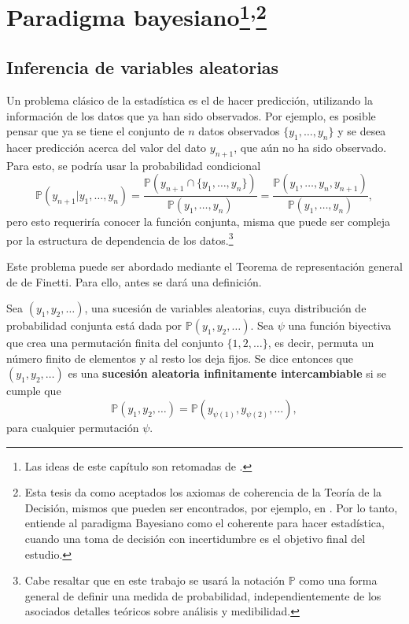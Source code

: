\chapter[Paradigma Bayesiano]{Paradigma bayesiano\footnote{Las ideas de este cap\'itulo son retomadas de \cite{Denison_BayesMethods}.}\textsuperscript{,}\footnote{Esta tesis da como aceptados los axiomas de coherencia de la Teoría de la Decisión, mismos que pueden ser encontrados, por ejemplo, en \cite{Fishburn_Axioms}. Por lo tanto, entiende al paradigma Bayesiano como el coherente para hacer estad\'istica, cuando una toma de decisi\'on con incertidumbre es el objetivo final del estudio. 
}}

\section{Inferencia de variables aleatorias}

Un problema clásico de la estad\'istica es el de hacer predicci\'on, utilizando la informaci\'on de los datos que ya han sido observados. Por ejemplo, es posible pensar que ya se tiene el conjunto de $n$ datos observados $\{y_1, \ldots, y_n\}$ y se desea hacer predicci\'on acerca del valor del dato $y_{n+1}$, que a\'un no ha sido observado. Para esto, se podr\'ia usar la probabilidad condicional
\begin{equation*}
    \mathbb{P}(y_{n+1}|y_1,\ldots,y_n) =
    \frac{\mathbb{P}(y_{n+1} \cap \{y_1, \ldots, y_n\})}{\mathbb{P}(y_1, \ldots, y_n)} =
    \frac{\mathbb{P}(y_1, \ldots, y_n,y_{n+1})}{\mathbb{P}(y_1, \ldots, y_n)},
\end{equation*}
pero esto requerir\'ia conocer la funci\'on conjunta, misma que puede ser compleja por la estructura de dependencia de los datos.\footnote{Cabe resaltar que en este trabajo se usar\'a la notaci\'on $\mathbb{P}$ como una forma general de definir una medida de probabilidad, independientemente de los asociados detalles te\'oricos sobre an\'alisis y medibilidad.}

Este problema puede ser abordado mediante el Teorema de representaci\'on general de de Finetti. Para ello, antes se dar\'a una definici\'on.

\begin{defin*}
    Sea $(y_1,y_2,\ldots)$, una sucesi\'on de variables aleatorias, cuya distribuci\'on de probabilidad conjunta est\'a dada por $\mathbb{P}(y_1,y_2,\ldots)$. Sea $\psi$ una funci\'on biyectiva que crea una permutaci\'on finita del conjunto $\{1,2,\ldots\}$, es decir, permuta un n\'umero finito de elementos y al resto los deja fijos.  
    Se dice entonces que $(y_1,y_2,\ldots)$ es una \textbf{sucesi\'on aleatoria infinitamente intercambiable} si se cumple que 
    \begin{equation*}
        \mathbb{P}(y_1,y_2,\ldots) = \mathbb{P}(y_{\psi(1)},y_{\psi(2)},\ldots),
    \end{equation*}
    para cualquier permutaci\'on $\psi$.
\end{defin*}

